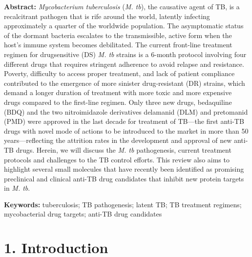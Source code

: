 \documentclass{article}
\begin{document}
\textbf{Abstract:} \textit{Mycobacterium tuberculosis} (\textit{M. tb}), the causative agent of TB, is a recalcitrant pathogen that is rife around the world, latently infecting approximately a quarter of the worldwide population. The asymptomatic status of the dormant bacteria escalates to the transmissible, active form when the host's immune system becomes debilitated. The current front-line treatment regimen for drugsensitive (DS) \textit{M. tb} strains is a 6-month protocol involving four different drugs that requires stringent adherence to avoid relapse and resistance. Poverty, difficulty to access proper treatment, and lack of patient compliance contributed to the emergence of more sinister drug-resistant (DR) strains, which demand a longer duration of treatment with more toxic and more expensive drugs compared to the first-line regimen. Only three new drugs, bedaquiline (BDQ) and the two nitroimidazole derivatives delamanid (DLM) and pretomanid (PMD) were approved in the last decade for treatment of TB—the first anti-TB drugs with novel mode of actions to be introduced to the market in more than 50 years—reflecting the attrition rates in the development and approval of new anti-TB drugs. Herein, we will discuss the \textit{M. tb} pathogenesis, current treatment protocols and challenges to the TB control efforts. This review also aims to highlight several small molecules that have recently been identified as promising preclinical and clinical anti-TB drug candidates that inhibit new protein targets in \textit{M. tb}.

\textbf{Keywords:} tuberculosis; TB pathogenesis; latent TB; TB treatment regimens; mycobacterial drug targets; anti-TB drug candidates

\section{\textbf{1. Introduction}}
\end{document}
